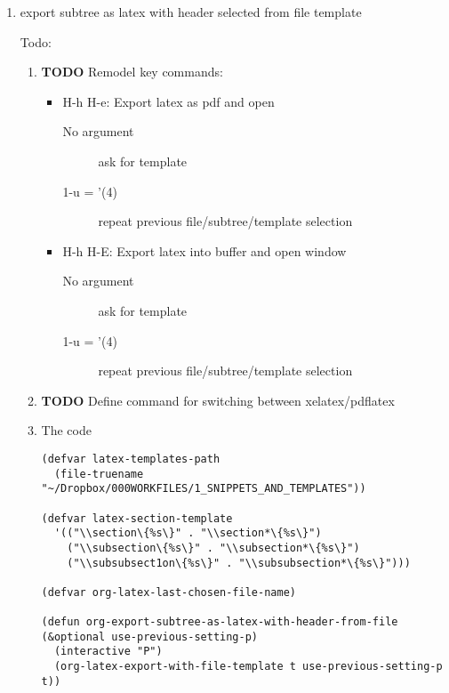 \documentclass{article}
\begin{document}
\begin{enumerate}
\item export subtree as latex with header selected from file template
\label{sec-2-5-11-1}

Todo:

\begin{enumerate}
\item {\bfseries\sffamily TODO} Remodel key commands:
\label{sec-2-5-11-1-1}
\begin{itemize}
\item H-h H-e: Export latex as pdf and open
\begin{description}
\item[{No argument}] ask for template
\item[{1-u = '(4)}] repeat previous file/subtree/template selection
\end{description}
\item H-h H-E: Export latex into buffer and open window
\begin{description}
\item[{No argument}] ask for template
\item[{1-u = '(4)}] repeat previous file/subtree/template selection
\end{description}
\end{itemize}

\item {\bfseries\sffamily TODO} Define command for switching between xelatex/pdflatex
\label{sec-2-5-11-1-2}

\item The code
\label{sec-2-5-11-1-3}


\begin{verbatim}
(defvar latex-templates-path
  (file-truename "~/Dropbox/000WORKFILES/1_SNIPPETS_AND_TEMPLATES"))

(defvar latex-section-template
  '(("\\section\{%s\}" . "\\section*\{%s\}")
    ("\\subsection\{%s\}" . "\\subsection*\{%s\}")
    ("\\subsubsect1on\{%s\}" . "\\subsubsection*\{%s\}")))

(defvar org-latex-last-chosen-file-name)

(defun org-export-subtree-as-latex-with-header-from-file (&optional use-previous-setting-p)
  (interactive "P")
  (org-latex-export-with-file-template t use-previous-setting-p t))


\end{verbatim}
\end{enumerate}
\end{enumerate}
\end{document}
